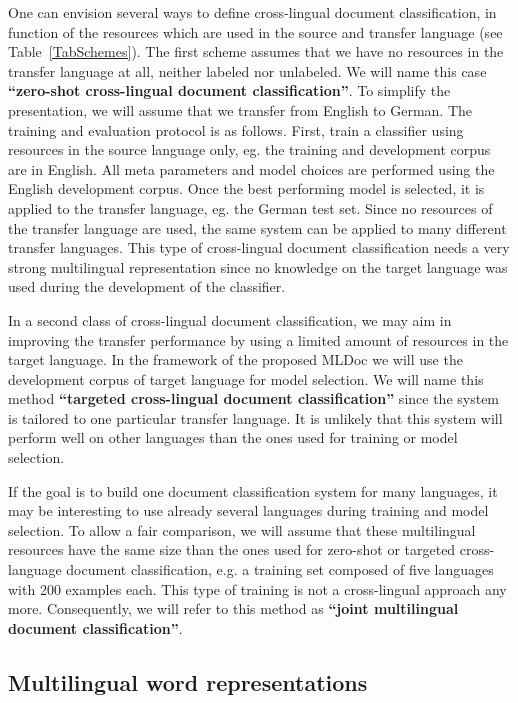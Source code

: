 \documentclass[10pt, a4paper]{article}
\begin{document}
One can envision several ways to define cross-lingual document classification, in function of the resources which are used in the source and transfer language (see Table~\ref{TabSchemes}). 
The first scheme assumes that we have no resources in the transfer language at all, neither labeled nor unlabeled. We will name this case \textbf{``zero-shot cross-lingual document classification''}. To simplify the presentation, we will assume that we transfer from English to German.
The training and evaluation protocol is as follows.
First, train a classifier using resources in the source language only, eg. the training and development corpus are in English. All meta parameters and model choices are performed using the English development corpus. Once the best performing model is selected, it is applied to the transfer language, eg. the German test set. Since no resources of the transfer language are used, the same system can be applied to many different transfer languages. This type of cross-lingual document classification needs a very strong multilingual representation since no knowledge on the target language was used during the development of the classifier.

In a second class of cross-lingual document classification, we may aim in improving the transfer performance by using a limited amount of resources in the target language. In the framework of the proposed MLDoc we will use the development corpus of target language for model selection. We will name this method \textbf{``targeted cross-lingual document classification''} since the system is tailored to one particular transfer language. It is unlikely that this system will perform well on other languages than the ones used for training or model selection.

If the goal is to build one document classification system for many languages, it may be interesting to use already several languages during training and model selection. To allow a fair comparison, we will assume that these multilingual resources have the same size than the ones used for zero-shot or targeted cross-language document classification, e.g. a training set composed of five languages with 200 examples each.
This type of training is not a cross-lingual approach any more. Consequently, we will refer to this method as \textbf{``joint multilingual document classification''}.

\subsection{Multilingual word representations}
\label{SectWordRepr}
\end{document}
